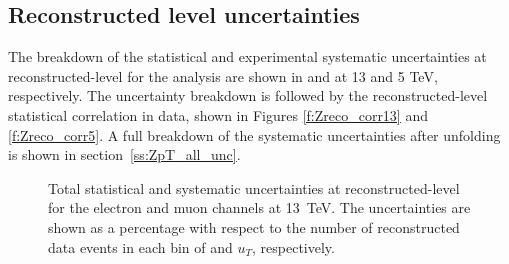 


\subsection{Reconstructed level uncertainties}
\label{ss:ZpT_reco_unc}

The breakdown of the statistical and experimental systematic uncertainties at reconstructed-level for the \Zboson analysis are shown in \Fig{\ref{f:Zunc_reco}} and \Fig{\ref{f:Zunc_reco5TeV}} at 13 and 5 TeV, respectively. The uncertainty breakdown is followed by the reconstructed-level statistical correlation in data, shown in Figures \ref{f:Zreco_corr13} and \ref{f:Zreco_corr5}. A full breakdown of the systematic uncertainties after unfolding is shown in section~\ref{ss:ZpT_all_unc}.

 \begin{figure}[h]
\centering
{}



\caption{
 Total statistical and systematic uncertainties at reconstructed-level for the electron and muon channels at 13~TeV. The uncertainties are shown as a percentage with respect to the number of reconstructed data events in each bin of \ptdilep and $u_{T}$, respectively. }
 \label{f:Zunc_reco}
 \end{figure}


